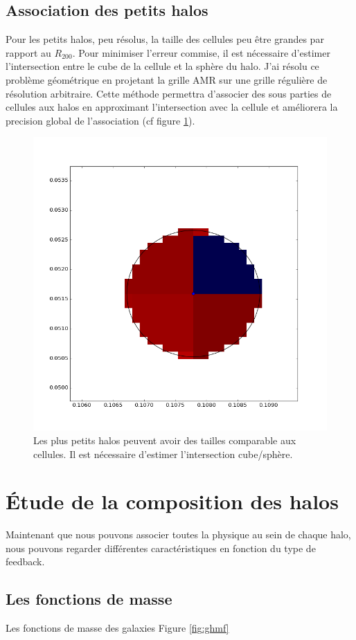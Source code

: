 \subsection{Association des petits halos}
Pour les petits halos, peu résolus, la taille des cellules peu être grandes par rapport au $R_{200}$.
Pour minimiser l'erreur commise, il est nécessaire d’estimer l'intersection entre le cube de la cellule et la sphère du halo.
J'ai résolu ce problème géométrique en projetant la grille \ac{AMR} sur une grille régulière de résolution arbitraire.
Cette méthode permettra d'associer des sous parties de cellules aux halos en approximant l'intersection avec la cellule et améliorera la precision global de l'association (cf figure \ref{fig:intersec}).

\begin{figure}
	\centering
	\includegraphics[width=.45\linewidth]{img/03/intersec.png}
    \caption[Projection des petits halo]{Les plus petits halos peuvent avoir des tailles comparable aux cellules.
    Il est nécessaire d’estimer l'intersection cube/sphère.
 	\label{fig:intersec}}
\end{figure}

\clearpage

\section{Étude de la composition des halos}

Maintenant que nous pouvons associer toutes la physique au sein de chaque halo, nous pouvons regarder  différentes caractéristiques en fonction du type de feedback.

\subsection{Les fonctions de masse}

Les fonctions de masse des galaxies 
Figure \ref{fig:ghmf}

